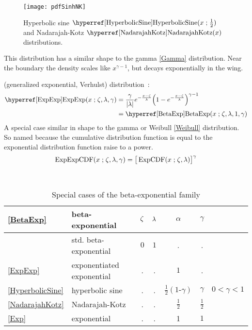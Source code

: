 \begin{figure}[ht]
\begin{center}
\texttt{[image: pdfSinhNK]}
\end{center}
\caption[Hyperbolic sine and Nadarajah-Kotz distributions.]{Hyperbolic sine  $\opr{HyperbolicSine}(x\given \tfrac{1}{2})$ and Nadarajah-Kotz $\opr{NadarajahKotz}(x)$ distributions. }
\end{figure}



This distribution has a similar shape to the gamma \eqref{Gamma} distribution. Near the boundary the density scales like $x^{\gamma-1}$, but decays exponentially in the wing.






 (generalized exponential, Verhulst) distribution~\cite{Verhulst1847,Ahuja1967,Gupta2001}:
\begin{align}
\label{ExpExp}
\opr{ExpExp}(x\given \pLoc,\pScale,\gamma) 
 &=  \frac{\gamma}{ \Left|\pScale\Right|}
 e^{- \frac{x-\pLoc}{\pScale} }  \Left(1 - e^{-\frac{x-\pLoc}{\pScale}  }\Right)^{\gamma-1} \checked
\\ & = \opr{BetaExp}(x\given \pLoc,\pScale,1, \gamma) \notag \checked
\end{align}
A special case similar in shape to the gamma or Weibull \eqref{Weibull} distribution. So named because the cumulative distribution function is equal to the exponential distribution function raise to a power.
\[
\op{ExpExpCDF}(x\given \pLoc,\pScale,\gamma) = \big[\op{ExpCDF}(x\given \pLoc,\pScale)\big]^{\gamma}
\checked
\notag
\]


\begin{table*}[bt]
\begin{center}
\caption[Beta-exponential distribution -- Special cases]{Special cases of the beta-exponential family}
~\\
{\renewcommand{\arraystretch}{1.25} 
\begin{tabular}{llccccl}
\eqref{BetaExp} & beta-exponential & $\zeta$ & $\lambda$ & $\alpha$ &  $\gamma$ \\
\hline  
 	& std. beta-exponential & $0$ & $1$ & . & . \\
\eqref{ExpExp} 		& exponentiated exponential & . & . & $1$ & . \\
\eqref{HyperbolicSine} & hyperbolic sine 	& . & .  & $\tfrac{1}{2}(1\text{-}\gamma)$ & $\gamma$ & $0<\gamma<1$ \\
\eqref{NadarajahKotz} &  Nadarajah-Kotz 	& . & . & $\tfrac{1}{2}$ & $\tfrac{1}{2}$ \\
\eqref{Exp} & exponential & . & . & 1 & $1$ \\
\end{tabular} }
\end{center}
\end{table*}

